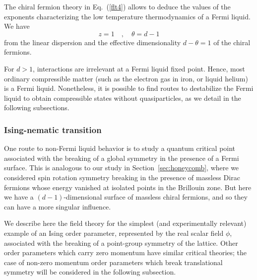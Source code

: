 \documentclass[10pt, oneside]{book}
\def\beq{\begin{equation}}
\def\eeq{\end{equation}}
\begin{document}
\begin{doublespace}
The chiral fermion theory in Eq.~(\ref{flt4}) allows to deduce the values of the exponents characterizing
the low temperature thermodynamics of a Fermi liquid. We have
\beq
z = 1 \quad, \quad \theta = d-1
\eeq
from the linear dispersion and the effective dimensionality $d-\theta = 1$ of the chiral fermions.

For $d>1$, interactions are irrelevant at a Fermi liquid fixed point.  Hence, most ordinary compressible matter (such as the electron gas in iron, or liquid helium) is a Fermi liquid.  Nonetheless, it is possible to find routes to destabilize the Fermi liquid to obtain compressible states without quasiparticles, as we detail 
in the following subsections.

\subsubsection{Ising-nematic transition}
\label{sec:isingnematic}

One route to non-Fermi liquid behavior is to study a quantum critical point associated with the breaking of a global
symmetry in the presence of a Fermi surface. This is analogous to our study in Section~\ref{sec:honeycomb}, where we
considered spin rotation symmetry breaking in the presence of massless Dirac fermions whose energy vanished at isolated
points in the Brillouin zone. But here we have a $(d-1)$-dimensional
surface of massless chiral fermions, and so they can have a more singular influence.

We describe here the field theory for the simplest (and experimentally relevant) example of an Ising order parameter, 
represented by the real scalar field $\phi$, associated with the breaking of a point-group symmetry of the lattice. Other order
parameters which carry zero momentum have similar critical theories; the case of non-zero momentum order parameters
which break translational symmetry will be considered in the following subsection.


\end{doublespace}
\end{document}
